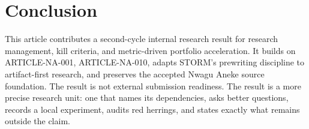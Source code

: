 \documentclass[sigconf,nonacm]{acmart}
\begin{document}
\section{Conclusion}
This article contributes a second-cycle internal research result for research management, kill criteria, and metric-driven portfolio acceleration. It
builds on ARTICLE-NA-001, ARTICLE-NA-010, adapts STORM's prewriting discipline to artifact-first
research, and preserves the accepted Nwagu Aneke source foundation. The result
is not external submission readiness. The result is a more precise research unit:
one that names its dependencies, asks better questions, records a local
experiment, audits red herrings, and states exactly what remains outside the
claim.



\end{document}
